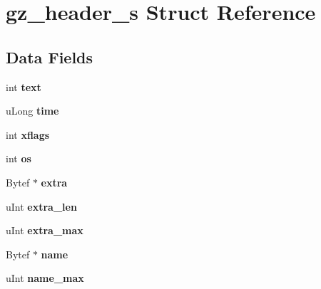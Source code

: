 \hypertarget{structgz__header__s}{}\section{gz\+\_\+header\+\_\+s Struct Reference}
\label{structgz__header__s}
\subsection*{Data Fields}
\begin{DoxyCompactItemize}
\item 
\mbox{\label{structgz__header__s_af94c3fadfed835a501bc1babc4b894f9}} 
int {\bfseries text}
\item 
\mbox{\label{structgz__header__s_a5f00bb6f9689c1abf7a54dad449ce9d3}} 
u\+Long {\bfseries time}
\item 
\mbox{\label{structgz__header__s_a40e35dc1a967c6537c6012cf5416210a}} 
int {\bfseries xflags}
\item 
\mbox{\label{structgz__header__s_a2708d3180d30b0563e3c2c965865cd4f}} 
int {\bfseries os}
\item 
\mbox{\label{structgz__header__s_a397959afc459da7e296c676a3d4c1915}} 
Bytef $\ast$ {\bfseries extra}
\item 
\mbox{\label{structgz__header__s_a271798915d64ae1f0d25a3a814ca0aa3}} 
u\+Int {\bfseries extra\+\_\+len}
\item 
\mbox{\label{structgz__header__s_ada4b174bf7ec0442b1091011c7342ca1}} 
u\+Int {\bfseries extra\+\_\+max}
\item 
\mbox{\label{structgz__header__s_a60ae5eee2882d1c25b3bb328972f0149}} 
Bytef $\ast$ {\bfseries name}
\item 
\mbox{\label{structgz__header__s_af503d267de15a461b81dcbbfb0d628e5}} 
u\+Int {\bfseries name\+\_\+max}
\item 
\mbox{\label{structgz__header__s_a1d4fd0807e838ce4bfde54aa021e18e9}} 

\end{DoxyCompactItemize}
